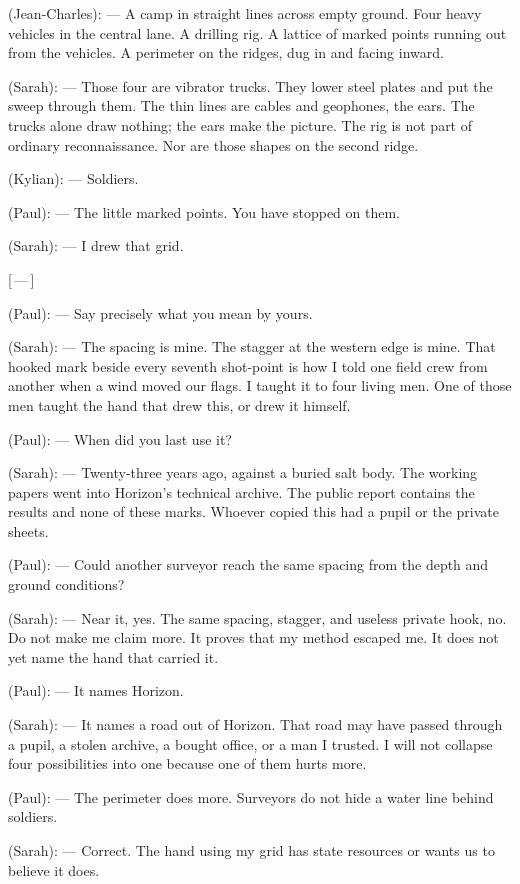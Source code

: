 \begin{room}
(Jean-Charles): --- A camp in straight lines across empty ground. Four heavy vehicles in the central lane. A drilling rig. A lattice of marked points running out from the vehicles. A perimeter on the ridges, dug in and facing inward.

(Sarah): --- Those four are vibrator trucks. They lower steel plates and put the sweep through them. The thin lines are cables and geophones, the ears. The trucks alone draw nothing; the ears make the picture. The rig is not part of ordinary reconnaissance. Nor are those shapes on the second ridge.

(Kylian): --- Soldiers.

(Paul): --- The little marked points. You have stopped on them.

(Sarah): --- I drew that grid.

\centerline{[\,---\,]}

(Paul): --- Say precisely what you mean by yours.

(Sarah): --- The spacing is mine. The stagger at the western edge is mine. That hooked mark beside every seventh shot-point is how I told one field crew from another when a wind moved our flags. I taught it to four living men. One of those men taught the hand that drew this, or drew it himself.

(Paul): --- When did you last use it?

(Sarah): --- Twenty-three years ago, against a buried salt body. The working papers went into Horizon's technical archive. The public report contains the results and none of these marks. Whoever copied this had a pupil or the private sheets.

(Paul): --- Could another surveyor reach the same spacing from the depth and ground conditions?

(Sarah): --- Near it, yes. The same spacing, stagger, and useless private hook, no. Do not make me claim more. It proves that my method escaped me. It does not yet name the hand that carried it.

(Paul): --- It names Horizon.

(Sarah): --- It names a road out of Horizon. That road may have passed through a pupil, a stolen archive, a bought office, or a man I trusted. I will not collapse four possibilities into one because one of them hurts more.

(Paul): --- The perimeter does more. Surveyors do not hide a water line behind soldiers.

(Sarah): --- Correct. The hand using my grid has state resources or wants us to believe it does.


\end{room}
